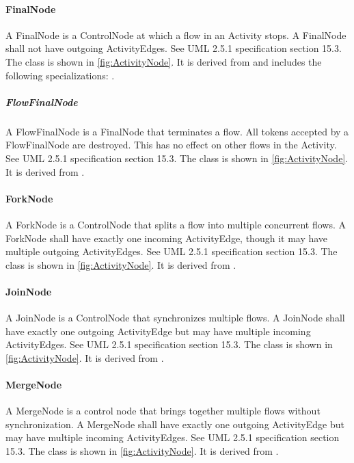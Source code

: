 \paragraph{FinalNode}%
\label{sec:uml:FinalNode}%
A FinalNode is a ControlNode at which a flow in an Activity stops. A FinalNode shall not have outgoing ActivityEdges. See UML 2.5.1 specification section 15.3.%
\linebreak%
\linebreak%
The  class is shown in \ref{fig:ActivityNode}. It is derived from  and includes the following specializations: . %
%
\subparagraph{FlowFinalNode}%
\label{sec:uml:FlowFinalNode}%
A FlowFinalNode is a FinalNode that terminates a flow. All tokens accepted by a FlowFinalNode are destroyed. This has no effect on other flows in the Activity. See UML 2.5.1 specification section 15.3.%
\linebreak%
\linebreak%
The  class is shown in \ref{fig:ActivityNode}. It is derived from .%
%
\paragraph{ForkNode}%
\label{sec:uml:ForkNode}%
A ForkNode is a ControlNode that splits a flow into multiple concurrent flows. A ForkNode shall have exactly one incoming ActivityEdge, though it may have multiple outgoing ActivityEdges. See UML 2.5.1 specification section 15.3.%
\linebreak%
\linebreak%
The  class is shown in \ref{fig:ActivityNode}. It is derived from .%
%
\paragraph{JoinNode}%
\label{sec:uml:JoinNode}%
A JoinNode is a ControlNode that synchronizes multiple flows. A JoinNode shall have exactly one outgoing ActivityEdge but may have multiple incoming ActivityEdges. See UML 2.5.1 specification section 15.3.%
\linebreak%
\linebreak%
The  class is shown in \ref{fig:ActivityNode}. It is derived from .%
%
\paragraph{MergeNode}%
\label{sec:uml:MergeNode}%
A MergeNode is a control node that brings together multiple flows without synchronization. A MergeNode shall have exactly one outgoing ActivityEdge but may have multiple incoming ActivityEdges. See UML 2.5.1 specification section 15.3.%
\linebreak%
\linebreak%
The  class is shown in \ref{fig:ActivityNode}. It is derived from .%
%
